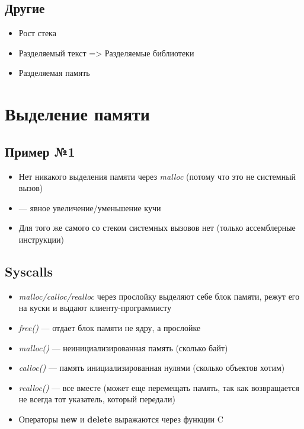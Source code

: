 \documentclass[../../lectures.tex]{subfiles}
\begin{document}
\subsection{Другие}
\begin{itemize}
    \item Рост стека
    \item Разделяемый текст => Разделяемые библиотеки
    \item Разделяемая память
\end{itemize}

\section{Выделение памяти}
\subsection{Пример №1}


\begin{itemize}
    \item Нет никакого выделения памяти через \emph{malloc} (потому что это не системный вызов)
    \item {} --- явное увеличение/уменьшение кучи
    \item Для того же самого со стеком системных вызовов нет (только ассемблерные инструкции)
\end{itemize}

\subsection{Syscalls}
\begin{itemize}
    \item \emph{malloc/calloc/realloc} через прослойку выделяют себе блок памяти, режут его на куски и выдают клиенту-программисту
    \item \emph{free()} --- отдает блок памяти не ядру, а прослойке
    \item \emph{malloc()} --- неинициализированная память (сколько байт)
    \item \emph{calloc()} --- память инициализированная нулями (сколько объектов хотим)
    \item \emph{realloc()} --- все вместе (может еще перемещать память, 
          так как возвращается не всегда тот указатель, который передали)
    \item Операторы \textbf{new} и \textbf{delete} выражаются через функции C
\end{itemize}
\end{document}
